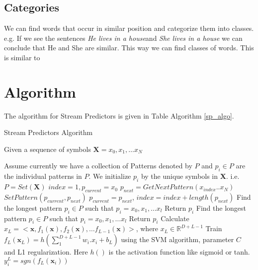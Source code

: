 \documentclass[fleqn,10pt]{olplainarticle}
\begin{document}
\subsection{Categories}
We can find words that occur in similar position and categorize them into classes. 
e.g. If we see the sentences \textit{He lives in a house}and \textit{She lives in a house} we can conclude that He and She are similar. 
This way we can find classes of words. This is similar to \cite{brown1992class}

\section*{Algorithm}
The algorithm for Stream Predictors is given in Table Algorithm \ref{sp_algo}.
\begin{algorithm}
\caption{Stream Predictors Algorithm}
\label{sp_algo}
\begin{algorithmic}[1]
\State Given a sequence of symbols $\textbf{X} = x_0, x_1, \ldots x_N$

\State Assume currently we have a collection of Patterns denoted by $P$ and $p_i \in P$ are the individual patterns in $P$.
\State We initialize $p_i$ by the unique symbols in \textbf{X}. i.e. $P = Set(\textbf{X})$
\State $index = 1, p_{current} = x_0$
\State $p_{next} = GetNextPattern(x_{index}.. x_N)$
\State $SetPattern(p_{current}, p_{next})$
\State $p_{current} = p_{next}$, $index = index + length(p_{next})$
\EndWhile
\EndProcedure
{}
\State Find the longest pattern $p_i \in P$ such that \(p_i = x_0, x_1, \ldots x_l\)
\State Return $p_i$
\EndProcedure
{}
\State Find the longest pattern $p_i \in P$ such that $p_i = x_{0}, x_1, \ldots x_l $
\State Return $p_i$
\EndProcedure
{}
\State Calculate $x_L = <\textbf{x}, f_{1}(\textbf{x}), f_{2}(\textbf{x}), \dots f_{L-1}(\textbf{x})>$, where $x_L \in \mathbb{R}^{D+L-1}$
\EndFor
\State Train $f_L(\textbf{x}_L) = h(\sum_1^{D+L-1}w_i.x_i + b_L)$ using the SVM algorithm, parameter $C$ and L1 regularization. Here $h()$ is the activation function like sigmoid or tanh.
\State $y_i^L = sgn(f_L(\textbf{x}_i))$
\EndProcedure
\end{algorithmic}
\end{algorithm}
\end{document}
